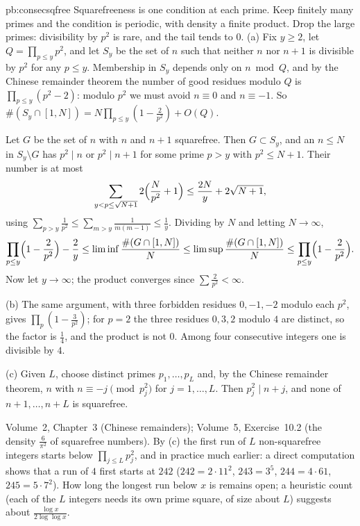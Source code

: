 \begin{solution}{pb:consecsqfree}
\idea Squarefreeness is one condition at each prime. Keep finitely many primes and the condition is periodic, with density a finite product. Drop the large primes: divisibility by $p^2$ is rare, and the tail tends to $0$.
\writeup (a) Fix $y\ge2$, let $Q=\prod_{p\le y}p^2$, and let $S_y$ be the set of $n$ such that neither $n$ nor $n+1$ is divisible by
$p^2$ for any $p\le y$. Membership in $S_y$ depends only on $n\bmod Q$, and by the Chinese remainder theorem the number of good
residues modulo $Q$ is $\prod_{p\le y}(p^2-2)$: modulo $p^2$ we must avoid $n\equiv0$ and $n\equiv-1$. So
$\#(S_y\cap[1,N])=N\prod_{p\le y}(1-\frac2{p^2})+O(Q)$.

Let $G$ be the set of $n$ with $n$ and $n+1$ squarefree. Then $G\subset S_y$, and an $n\le N$ in $S_y\setminus G$ has $p^2\mid n$ or
$p^2\mid n+1$ for some prime $p>y$ with $p^2\le N+1$. Their number is at most
\[
\sum_{y<p\le\sqrt{N+1}}2\Bigl(\frac N{p^2}+1\Bigr)\le\frac{2N}y+2\sqrt{N+1},
\]
using $\sum_{p>y}\frac1{p^2}\le\sum_{m>y}\frac1{m(m-1)}\le\frac1y$. Dividing by $N$ and letting $N\to\infty$,
\[
\prod_{p\le y}\Bigl(1-\frac2{p^2}\Bigr)-\frac2y\le\liminf\frac{\#(G\cap[1,N])}N\le\limsup\frac{\#(G\cap[1,N])}N\le\prod_{p\le y}\Bigl(1-\frac2{p^2}\Bigr).
\]
Now let $y\to\infty$; the product converges since $\sum\frac2{p^2}<\infty$.

(b) The same argument, with three forbidden residues $0,-1,-2$ modulo each $p^2$, gives $\prod_p(1-\frac3{p^2})$; for $p=2$ the
three residues $0,3,2$ modulo $4$ are distinct, so the factor is $\frac14$, and the product is not $0$. Among four consecutive
integers one is divisible by $4$.

(c) Given $L$, choose distinct primes $p_1,\dots,p_L$ and, by the Chinese remainder theorem, $n$ with $n\equiv-j\pmod{p_j^2}$ for
$j=1,\dots,L$. Then $p_j^2\mid n+j$, and none of $n+1,\dots,n+L$ is squarefree.

\tools Volume~2, Chapter~3 (Chinese remainders); Volume~5, Exercise~10.2 (the density $\frac6{\pi^2}$ of squarefree numbers).
\leads By (c) the first run of $L$ non-squarefree integers starts below $\prod_{j\le L}p_j^2$, and in practice much
earlier: a direct computation shows that a run of $4$ first starts at $242$ ($242=2\cdot11^2$, $243=3^5$, $244=4\cdot61$, $245=5\cdot7^2$).
How long the longest run below $x$ is remains open; a heuristic count (each of the $L$ integers needs its own prime square,
of size about $L$) suggests about $\frac{\log x}{2\log\log x}$.
\end{solution}

